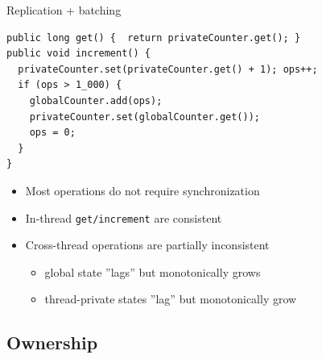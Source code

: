 \begin{frame}{Replication + batching}

\begin{verbatim}
public long get() {  return privateCounter.get(); }
public void increment() {
  privateCounter.set(privateCounter.get() + 1); ops++;
  if (ops > 1_000) { 
    globalCounter.add(ops); 
    privateCounter.set(globalCounter.get()); 
    ops = 0; 
  }
}
\end{verbatim}

\begin{itemize}
    \item Most operations do not require synchronization
    \item In-thread \texttt{get/increment} are consistent
    \item Cross-thread operations are partially inconsistent 
    \begin{itemize}
      \item global state ''lags'' but monotonically grows
      \item thread-private states ''lag'' but monotonically grow
    \end{itemize}
\end{itemize}
\end{frame}

\subsection{Ownership}
\showTOCSub

